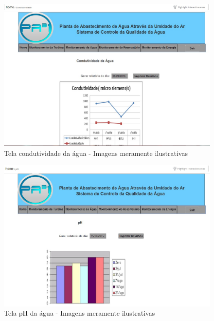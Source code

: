 \begin{center}
\begin{figure}[!ht]
\centering
\includegraphics[scale=0.5]{figuras/8}
\caption[Tela condutividade da água]{Tela condutividade da água - Imagens meramente ilustrativas}
\label{tela_condutividade_da_agua}
\end{figure}
\clearpage

\begin{figure}[!ht]
\centering
\includegraphics[scale=0.5]{figuras/9}
\caption[Tela pH da água]{Tela pH da água - Imagens meramente ilustrativas}
\label{tela_pH_da_agua}
\end{figure}



\end{center}
